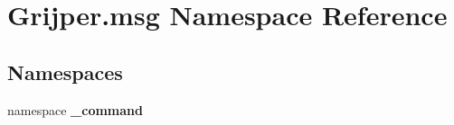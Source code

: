 \section{Grijper.\-msg Namespace Reference}
\label{namespaceGrijper_1_1msg}
\subsection*{Namespaces}
\begin{DoxyCompactItemize}
\item 
namespace {\bf \-\_\-command}
\end{DoxyCompactItemize}
